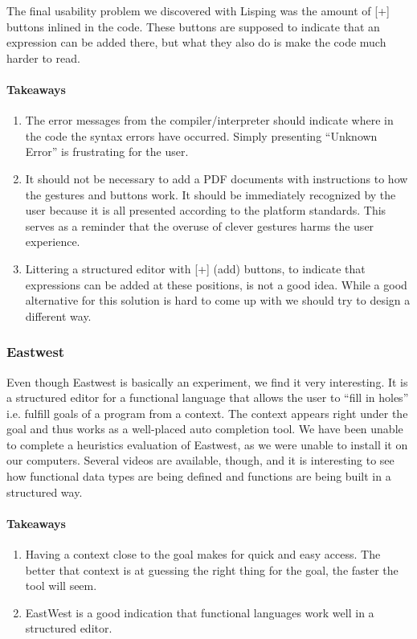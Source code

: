 The final usability problem we discovered with Lisping was the amount of [+] buttons inlined in the code. These buttons are supposed to indicate that an expression can be added there, but what they also do is make the code much harder to read. 


\paragraph{Takeaways}
\begin{enumerate}
	\item The error messages from the compiler/interpreter should indicate where in the code the syntax errors have occurred. Simply presenting “Unknown Error” is frustrating for the user.
	\item It should not be necessary to add a PDF documents with instructions to how the gestures and buttons work. It should be immediately recognized by the user because it is all presented according to the platform standards. This serves as a reminder that the overuse of clever gestures harms the user experience.
	\item Littering a structured editor with [+] (add) buttons, to indicate that expressions can be added at these positions, is not a good idea. While a good alternative for this solution is hard to come up with we should try to design a different way.
\end{enumerate}



\subsubsection{Eastwest}
\label{subsub:Eastwest}
Even though Eastwest is basically an experiment, we find it very interesting. It is a structured editor for a functional language that allows the user to ``fill in holes'' i.e. fulfill goals of a program from a context. The context appears right under the goal and thus works as a well-placed auto completion tool. We have been unable to complete a heuristics evaluation of Eastwest, as we were unable to install it on our computers. Several videos are available, though, and it is interesting to see how functional data types are being defined and functions are being built in a structured way. 

\paragraph{Takeaways}
\begin{enumerate}
	\item Having a context close to the goal makes for quick and easy access. The better that context is at guessing the right thing for the goal, the faster the tool will seem.
	\item EastWest is a good indication that functional languages work well in a structured editor.
\end{enumerate}


